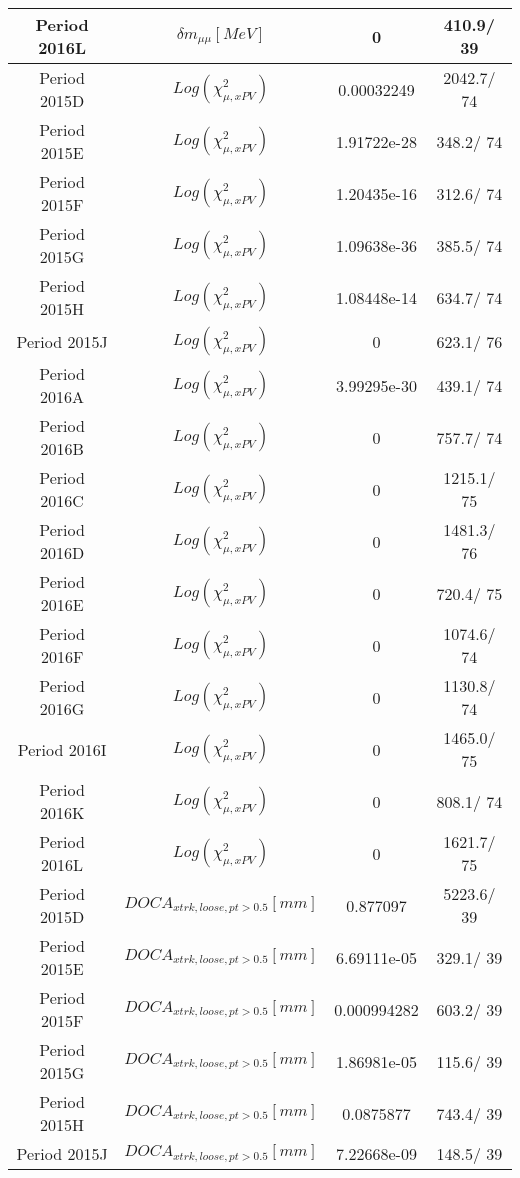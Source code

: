 \documentclass{article}
\begin{document}
\begin{longtable}{c|c|c|c}
\hline
 Period 2016L & $\delta m_{\mu\mu} [MeV]$ & 0 & 410.9/ 39\\
\hline
 Period 2015D & $Log(\chi^{2}_{\mu,xPV})$ & 0.00032249 & 2042.7/ 74\\
\hline
 Period 2015E & $Log(\chi^{2}_{\mu,xPV})$ & 1.91722e-28 & 348.2/ 74\\
\hline
 Period 2015F & $Log(\chi^{2}_{\mu,xPV})$ & 1.20435e-16 & 312.6/ 74\\
\hline
 Period 2015G & $Log(\chi^{2}_{\mu,xPV})$ & 1.09638e-36 & 385.5/ 74\\
\hline
 Period 2015H & $Log(\chi^{2}_{\mu,xPV})$ & 1.08448e-14 & 634.7/ 74\\
\hline
 Period 2015J & $Log(\chi^{2}_{\mu,xPV})$ & 0 & 623.1/ 76\\
\hline
 Period 2016A & $Log(\chi^{2}_{\mu,xPV})$ & 3.99295e-30 & 439.1/ 74\\
\hline
 Period 2016B & $Log(\chi^{2}_{\mu,xPV})$ & 0 & 757.7/ 74\\
\hline
 Period 2016C & $Log(\chi^{2}_{\mu,xPV})$ & 0 & 1215.1/ 75\\
\hline
 Period 2016D & $Log(\chi^{2}_{\mu,xPV})$ & 0 & 1481.3/ 76\\
\hline
 Period 2016E & $Log(\chi^{2}_{\mu,xPV})$ & 0 & 720.4/ 75\\
\hline
 Period 2016F & $Log(\chi^{2}_{\mu,xPV})$ & 0 & 1074.6/ 74\\
\hline
 Period 2016G & $Log(\chi^{2}_{\mu,xPV})$ & 0 & 1130.8/ 74\\
\hline
 Period 2016I & $Log(\chi^{2}_{\mu,xPV})$ & 0 & 1465.0/ 75\\
\hline
 Period 2016K & $Log(\chi^{2}_{\mu,xPV})$ & 0 & 808.1/ 74\\
\hline
 Period 2016L & $Log(\chi^{2}_{\mu,xPV})$ & 0 & 1621.7/ 75\\
\hline
 Period 2015D & $DOCA_{xtrk, loose, pt>0.5} [mm]$ & 0.877097 & 5223.6/ 39\\
\hline
 Period 2015E & $DOCA_{xtrk, loose, pt>0.5} [mm]$ & 6.69111e-05 & 329.1/ 39\\
\hline
 Period 2015F & $DOCA_{xtrk, loose, pt>0.5} [mm]$ & 0.000994282 & 603.2/ 39\\
\hline
 Period 2015G & $DOCA_{xtrk, loose, pt>0.5} [mm]$ & 1.86981e-05 & 115.6/ 39\\
\hline
 Period 2015H & $DOCA_{xtrk, loose, pt>0.5} [mm]$ & 0.0875877 & 743.4/ 39\\
\hline
 Period 2015J & $DOCA_{xtrk, loose, pt>0.5} [mm]$ & 7.22668e-09 & 148.5/ 39\\

\end{longtable}
\end{document}
